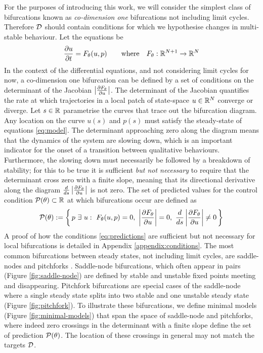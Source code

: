 \documentclass{article}
\begin{document}
For the purposes of introducing this work, we will consider the simplest class of bifurcations known as \textit{co-dimension one} bifurcations not including limit cycles. Therefore $\mathcal{D}$ should contain conditions for which we hypothesise changes in multi-stable behaviour. Let the equations be
\begin{align}
	\frac{\partial u}{\partial t}=F_{\theta}(u,p)
	\qquad\mathrm{where}\quad
	F_{\theta} : \mathbb{R}^{N+1}\rightarrow\mathbb{R}^N
	\label{eq:model}
\end{align}
In the context of the differential equations, and not considering limit cycles for now, a co-dimension one bifurcation can be defined by a set of conditions on the determinant of the Jacobian $\left| \frac{\partial F_{\theta}}{\partial u} \right|$. The determinant of the Jacobian quantifies the rate at which trajectories in a local patch of state-space $u\in\mathbb{R}^N$ converge or diverge. Let $s\in\mathbb{R}$ parametrise the curves that trace out the bifurcation diagram. Any location on the curve $u(s)$ and $p(s)$ must satisfy the steady-state of equations \eqref{eq:model}. The determinant approaching zero along the diagram means that the dynamics of the system are slowing down, which is an important indicator for the onset of a transition between qualitative behaviours. Furthermore, the slowing down must necessarily be followed by a breakdown of stability; for this to be true it is sufficient \textit{but not necessary} to require that the determinant cross zero with a finite slope, meaning that its directional derivative along the diagram $\frac{d}{ds}\left| \frac{\partial F_{\theta}}{\partial u} \right|$ is not zero. The set of predicted values for the control condition $\mathcal{P}(\theta)\subset\mathbb{R}$ at which bifurcations occur are defined as
\begin{align}
	\mathcal{P}(\theta):=\left\{\,
	p\,\,\exists\,\,u:\,\,F_{\theta}(u,p)=0,\,\,\left| \frac{\partial F_{\theta}}{\partial u} \right|=0,
	\,\, \frac{d}{ds}\left| \frac{\partial F_{\theta}}{\partial u} \right|\neq0
	\,\right\}
	\label{eq:predictions}
\end{align}
A proof of how the conditions \eqref{eq:predictions} are sufficient but not necessary for local bifurcations is detailed in Appendix \ref{appendix:conditions}. The most common bifurcations between steady states, not including limit cycles, are saddle-nodes and pitchforks \cite{Haragus2011LocalSystems}. Saddle-node bifurcations, which often appear in pairs (Figure \ref{fig:saddle-node}) are defined by stable and unstable fixed points meeting and disappearing. Pitchfork bifurcations are special cases of the saddle-node where a single steady state splits into two stable and one unstable steady state (Figure \ref{fig:pitchfork}). To illustrate these bifurcations, we define minimal models (Figure \ref{fig:minimal-models}) that span the space of saddle-node and pitchforks, where indeed zero crossings in the determinant with a finite slope define the set of prediction $\mathcal{P}(\theta)$. The location of these crossings in general may not match the targets $\mathcal{D}$.
\end{document}
